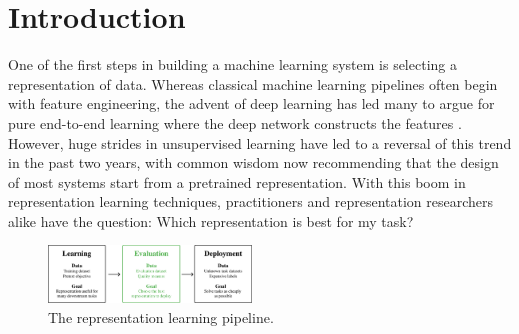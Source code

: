 \newcommand{\mdl}{\text{MDL}}
\newcommand{\hyp}{h}
\newcommand{\hypclass}{\mathcal{H}}
\newcommand{\method}{\textsc{LeCalf}}
\renewcommand{\eps}{\varepsilon}



\setlength{\aboverulesep}{0pt}
\setlength{\belowrulesep}{0pt}
\setlength{\extrarowheight}{.75ex}


\section{Introduction}

One of the first steps in building a machine learning system is selecting a representation of data.
Whereas classical machine learning pipelines often begin with feature engineering, the advent of deep learning has led many to argue for pure end-to-end learning where the deep network constructs the features \citep{lecun2015deep}.
However, huge strides in unsupervised learning \citep{Hnaff2020DataEfficientIR,Chen2020ASF, he2019momentum, Oord2018RepresentationLW, bachman2019learning, devlin2018bert, liu2019roberta, raffel2019exploring, gpt3} have led to a reversal of this trend in the past two years, with common wisdom now recommending that the design of most systems start from a pretrained representation.
With this boom in representation learning techniques, practitioners and representation researchers alike have the question: Which representation is best for my task?


\begin{figure}[h]
\centering
\includegraphics[width=0.48\textwidth]{figures/repr-eval/representation_pipeline.pdf}
\caption{The representation learning pipeline.}
\label{fig:representation_pipeline}
\end{figure}

